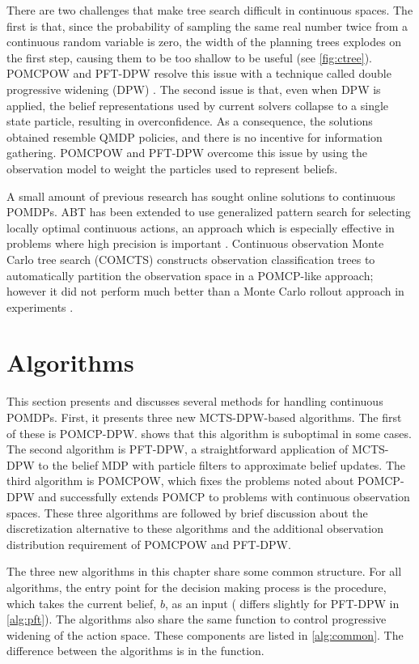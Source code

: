 There are two challenges that make tree search difficult in continuous spaces.
The first is that, since the probability of sampling the same real number twice from a continuous random variable is zero, the width of the planning trees explodes on the first step, causing them to be too shallow to be useful (see \cref{fig:ctree}).
POMCPOW and PFT-DPW resolve this issue with a technique called double progressive widening (DPW) \cite{couetoux2011double}. 
The second issue is that, even when DPW is applied, the belief representations used by current solvers collapse to a single state particle, resulting in overconfidence.
As a consequence, the solutions obtained resemble QMDP policies, and there is no incentive for information gathering.
POMCPOW and PFT-DPW overcome this issue by using the observation model to weight the particles used to represent beliefs.

A small amount of previous research has sought online solutions to continuous POMDPs.
ABT has been extended to use generalized pattern search for selecting locally optimal continuous actions, an approach which is especially effective in problems where high precision is important \cite{seiler2015online,wang2018online}.
Continuous observation Monte Carlo tree search (COMCTS) constructs observation classification trees to automatically partition the observation space in a POMCP-like approach; however it did not perform much better than a Monte Carlo rollout approach in experiments \cite{pas2012simulation}.

\section{Algorithms}

This section presents and discusses several methods for handling continuous POMDPs.
First, it presents three new MCTS-DPW-based algorithms.
The first of these is POMCP-DPW.
 shows that this algorithm is suboptimal in some cases.
The second algorithm is PFT-DPW, a straightforward application of MCTS-DPW to the belief MDP with particle filters to approximate belief updates.
The third algorithm is POMCPOW, which fixes the problems noted about POMCP-DPW and successfully extends POMCP to problems with continuous observation spaces.
These three algorithms are followed by brief discussion about the discretization alternative to these algorithms and the additional observation distribution requirement of POMCPOW and PFT-DPW.

The three new algorithms in this chapter share some common structure.
For all algorithms, the entry point for the decision making process is the  procedure, which takes the current belief, $b$, as an input ( differs slightly for PFT-DPW in \cref{alg:pft}).
The algorithms also share the same  function to control progressive widening of the action space.
These components are listed in \cref{alg:common}.
The difference between the algorithms is in the  function.

